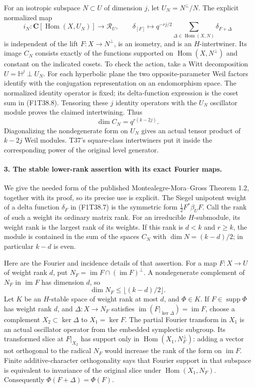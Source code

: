 For an isotropic subspace \(N\subset U\) of dimension
\(j\), let \(U_N=N^\perp/N\). The explicit normalized map
\[
 i_N:\mathbf C[\operatorname{Hom}(X,U_N)]
       \longrightarrow\mathcal R_U,
 \qquad
 \delta_{[F]}\longmapsto q^{-rj/2}
                  \sum_{\Delta\in\operatorname{Hom}(X,N)}
                         \delta_{F+\Delta}
 \tag{F1T38.8}
\]
is independent of the lift \(F:X\to N^\perp\), is an
isometry, and is an \(H\)-intertwiner. Its image
\(C_N\) consists exactly of the functions supported on
\(\operatorname{Hom}(X,N^\perp)\) and constant on the
indicated cosets. To check the action, take a Witt
decomposition \(U=\mathbb H^j\perp U_N\). For each
hyperbolic plane the two opposite-parameter Weil factors
identify with the conjugation representation on an
endomorphism space. The normalized identity operator is
fixed; its delta-function expression is the coset sum
in (F1T38.8). Tensoring these \(j\) identity operators
with the \(U_N\) oscillator module proves the claimed
intertwining. Thus
\[
        \dim C_N=q^{r(k-2j)}.
 \tag{F1T38.9}
\]
Diagonalizing the nondegenerate form on \(U_N\) gives an
actual tensor product of \(k-2j\) Weil modules. T37's
square-class intertwiners put it inside the corresponding
power of the original level generator.

\paragraph{3. The stable lower-rank assertion with its exact Fourier maps.}
We give the needed form of the published
Montealegre-Mora--Gross Theorem 1.2, together with its
proof, so its precise use is explicit. The Siegel
unipotent weight of a delta function \(\delta_F\) in
(F1T38.7) is the symmetric form \(\frac12F^*\beta_U F\).
Call the rank of such a weight its ordinary matrix rank.
For an irreducible \(H\)-submodule, its weight rank is the
largest rank of its weights. If this rank is \(d<k\)
and \(r\ge k\), the module is contained in the sum of
the spaces \(C_N\) with \(\dim N=(k-d)/2\); in
particular \(k-d\) is even.

Here are the Fourier and incidence details of that
assertion. For a map \(F:X\to U\) of weight rank \(d\),
put \(N_F=\operatorname{im}F\cap(\operatorname{im}F)^\perp\).
A nondegenerate complement of \(N_F\) in \(\operatorname{im}F\)
has dimension \(d\), so
\[
                  \dim N_F\le\lfloor(k-d)/2\rfloor.
 \tag{F1T38.10}
\]
Let \(K\) be an \(H\)-stable space of weight rank at most
\(d\), and \(\Phi\in K\). If \(F\in\operatorname{supp}\Phi\)
has weight rank \(d\), and \(\Delta:X\to N_F\) satisfies
\(\operatorname{im}(F|_{\ker\Delta})=\operatorname{im}F\),
choose a complement \(X_2\subset\ker\Delta\) to
\(X_1=\ker F\). The partial Fourier transform in \(X_1\)
is an actual oscillator operator from the embedded
symplectic subgroup. Its transformed slice at \(F|_{X_2}\)
has support only in \(\operatorname{Hom}(X_1,N_F^\perp)\):
adding a vector not orthogonal to the radical \(N_F\)
would increase the rank of the form on \(\operatorname{im}F\).
Finite additive-character orthogonality says that Fourier
support in that subspace is equivalent to invariance of
the original slice under \(\operatorname{Hom}(X_1,N_F)\).
Consequently \(\Phi(F+\Delta)=\Phi(F)\).

